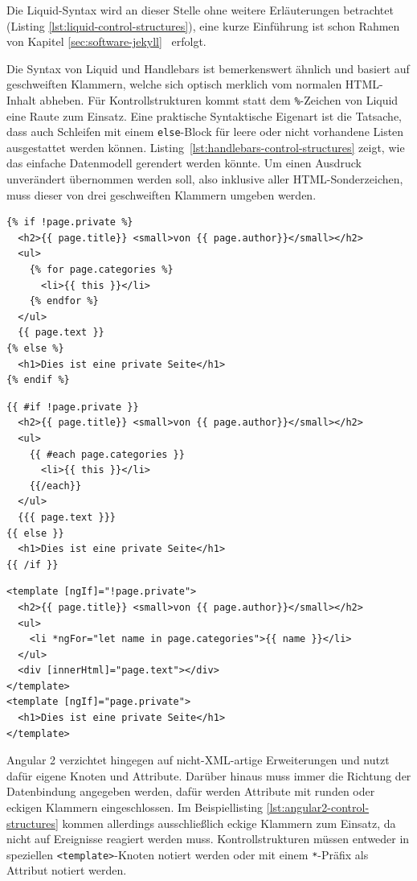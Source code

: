 Die Liquid-Syntax wird an dieser Stelle ohne weitere Erläuterungen betrachtet (Listing \ref{lst:liquid-control-structures}), eine kurze Einführung ist schon Rahmen von Kapitel \ref{sec:software-jekyll}~ erfolgt.

Die Syntax von Liquid und Handlebars ist bemerkenswert ähnlich und basiert auf geschweiften Klammern, welche sich optisch merklich vom normalen HTML-Inhalt abheben. Für Kontrollstrukturen kommt statt dem \texttt{\%}-Zeichen von Liquid eine Raute zum Einsatz. Eine praktische Syntaktische Eigenart ist die Tatsache, dass auch Schleifen mit einem \texttt{else}-Block für leere oder nicht vorhandene Listen ausgestattet werden können. Listing~\ref{lst:handlebars-control-structures} zeigt, wie das einfache Datenmodell gerendert werden könnte. Um einen Ausdruck unverändert übernommen werden soll, also inklusive aller HTML-Sonderzeichen, muss dieser von drei geschweiften Klammern umgeben werden.

\begin{lstlisting}[float=p,caption={Kontrollstrukturen in Liquid}, label={lst:liquid-control-structures}]
{% if !page.private %}
  <h2>{{ page.title}} <small>von {{ page.author}}</small></h2>
  <ul>
    {% for page.categories %} 
      <li>{{ this }}</li> 
    {% endfor %}
  </ul>
  {{ page.text }}
{% else %}
  <h1>Dies ist eine private Seite</h1>
{% endif %}
\end{lstlisting}

\begin{lstlisting}[float=p,caption={Kontrollstrukturen in Handlebars}, label={lst:handlebars-control-structures}]
{{ #if !page.private }}
  <h2>{{ page.title}} <small>von {{ page.author}}</small></h2>
  <ul>
    {{ #each page.categories }}
      <li>{{ this }}</li>
    {{/each}}
  </ul>
  {{{ page.text }}}
{{ else }}
  <h1>Dies ist eine private Seite</h1>
{{ /if }}
\end{lstlisting}

\begin{lstlisting}[float=p,caption={Kontrollstrukturen in Angular 2}, label={lst:angular2-control-structures}]
<template [ngIf]="!page.private">
  <h2>{{ page.title}} <small>von {{ page.author}}</small></h2>
  <ul>
    <li *ngFor="let name in page.categories">{{ name }}</li>
  </ul>
  <div [innerHtml]="page.text"></div>
</template>
<template [ngIf]="page.private">
  <h1>Dies ist eine private Seite</h1>
</template>
\end{lstlisting}

Angular 2 verzichtet hingegen auf nicht-XML-artige Erweiterungen und nutzt dafür eigene Knoten und Attribute. Darüber hinaus muss immer die Richtung der Datenbindung angegeben werden, dafür werden Attribute mit runden oder eckigen Klammern eingeschlossen. Im Beispiellisting \ref{lst:angular2-control-structures} kommen allerdings ausschließlich eckige Klammern zum Einsatz, da nicht auf Ereignisse reagiert werden muss. Kontrollstrukturen müssen entweder in speziellen \texttt{<template>}-Knoten notiert werden oder mit einem \texttt{*}-Präfix als Attribut notiert werden.

